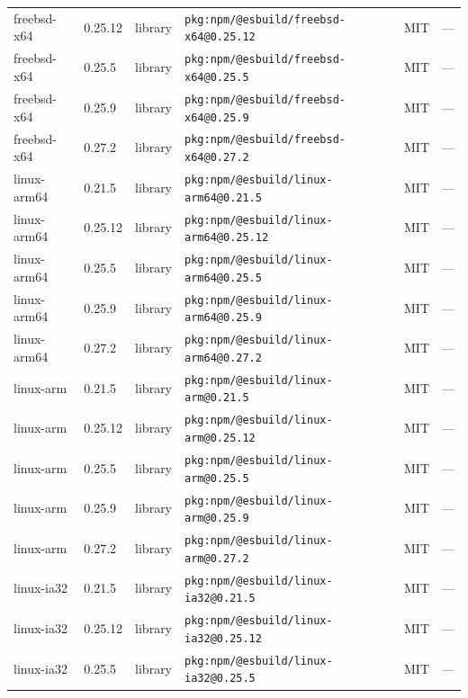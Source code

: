 \documentclass[11pt,a4paper]{article}
\begin{document}
\begin{longtable}{|p{4cm}|p{2cm}|p{1.6cm}|p{5cm}|p{1.5cm}|p{3.5cm}|}
\raggedright freebsd-x64 & 0.25.12 & library & \small\texttt{pkg:npm/@esbuild/freebsd-x64@0.25.12} & MIT & \small — \\
\raggedright freebsd-x64 & 0.25.5 & library & \small\texttt{pkg:npm/@esbuild/freebsd-x64@0.25.5} & MIT & \small — \\
\raggedright freebsd-x64 & 0.25.9 & library & \small\texttt{pkg:npm/@esbuild/freebsd-x64@0.25.9} & MIT & \small — \\
\raggedright freebsd-x64 & 0.27.2 & library & \small\texttt{pkg:npm/@esbuild/freebsd-x64@0.27.2} & MIT & \small — \\
\raggedright linux-arm64 & 0.21.5 & library & \small\texttt{pkg:npm/@esbuild/linux-arm64@0.21.5} & MIT & \small — \\
\raggedright linux-arm64 & 0.25.12 & library & \small\texttt{pkg:npm/@esbuild/linux-arm64@0.25.12} & MIT & \small — \\
\raggedright linux-arm64 & 0.25.5 & library & \small\texttt{pkg:npm/@esbuild/linux-arm64@0.25.5} & MIT & \small — \\
\raggedright linux-arm64 & 0.25.9 & library & \small\texttt{pkg:npm/@esbuild/linux-arm64@0.25.9} & MIT & \small — \\
\raggedright linux-arm64 & 0.27.2 & library & \small\texttt{pkg:npm/@esbuild/linux-arm64@0.27.2} & MIT & \small — \\
\raggedright linux-arm & 0.21.5 & library & \small\texttt{pkg:npm/@esbuild/linux-arm@0.21.5} & MIT & \small — \\
\raggedright linux-arm & 0.25.12 & library & \small\texttt{pkg:npm/@esbuild/linux-arm@0.25.12} & MIT & \small — \\
\raggedright linux-arm & 0.25.5 & library & \small\texttt{pkg:npm/@esbuild/linux-arm@0.25.5} & MIT & \small — \\
\raggedright linux-arm & 0.25.9 & library & \small\texttt{pkg:npm/@esbuild/linux-arm@0.25.9} & MIT & \small — \\
\raggedright linux-arm & 0.27.2 & library & \small\texttt{pkg:npm/@esbuild/linux-arm@0.27.2} & MIT & \small — \\
\raggedright linux-ia32 & 0.21.5 & library & \small\texttt{pkg:npm/@esbuild/linux-ia32@0.21.5} & MIT & \small — \\
\raggedright linux-ia32 & 0.25.12 & library & \small\texttt{pkg:npm/@esbuild/linux-ia32@0.25.12} & MIT & \small — \\
\raggedright linux-ia32 & 0.25.5 & library & \small\texttt{pkg:npm/@esbuild/linux-ia32@0.25.5} & MIT & \small — \\

\end{longtable}
\end{document}
